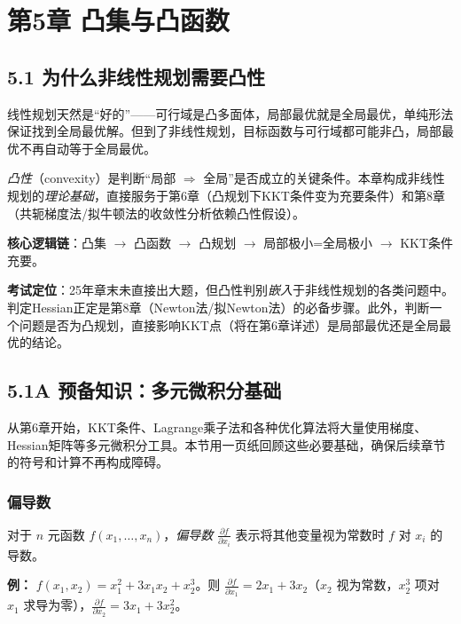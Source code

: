 \section{第5章 \quad 凸集与凸函数}

\subsection{5.1 为什么非线性规划需要凸性}

线性规划天然是“好的”——可行域是凸多面体，局部最优就是全局最优，单纯形法保证找到全局最优解。但到了非线性规划，目标函数与可行域都可能非凸，局部最优不再自动等于全局最优。

\emph{凸性}（convexity）是判断“局部 $\Rightarrow$ 全局”是否成立的关键条件。本章构成非线性规划的\emph{理论基础}，直接服务于第6章（凸规划下KKT条件变为充要条件）和第8章（共轭梯度法/拟牛顿法的收敛性分析依赖凸性假设）。

\begin{notebox}
\textbf{核心逻辑链}：凸集 $\to$ 凸函数 $\to$ 凸规划 $\to$ 局部极小=全局极小 $\to$ KKT条件充要。

\textbf{考试定位}：25年章末未直接出大题，但凸性判别\emph{嵌入}于非线性规划的各类问题中。判定Hessian正定是第8章（Newton法/拟Newton法）的必备步骤。此外，判断一个问题是否为凸规划，直接影响KKT点（将在第6章详述）是局部最优还是全局最优的结论。
\end{notebox}

\subsection{5.1A 预备知识：多元微积分基础}

从第6章开始，KKT条件、Lagrange乘子法和各种优化算法将大量使用梯度、Hessian矩阵等多元微积分工具。本节用一页纸回顾这些必要基础，确保后续章节的符号和计算不再构成障碍。

\subsubsection{偏导数}

对于 $n$ 元函数 $f(x_1,\dots,x_n)$，\emph{偏导数} $\frac{\partial f}{\partial x_i}$ 表示将其他变量视为常数时 $f$ 对 $x_i$ 的导数。

\textbf{例：} $f(x_1,x_2)=x_1^2+3x_1x_2+x_2^3$。则 $\frac{\partial f}{\partial x_1}=2x_1+3x_2$（$x_2$ 视为常数，$x_2^3$ 项对 $x_1$ 求导为零），$\frac{\partial f}{\partial x_2}=3x_1+3x_2^2$。

